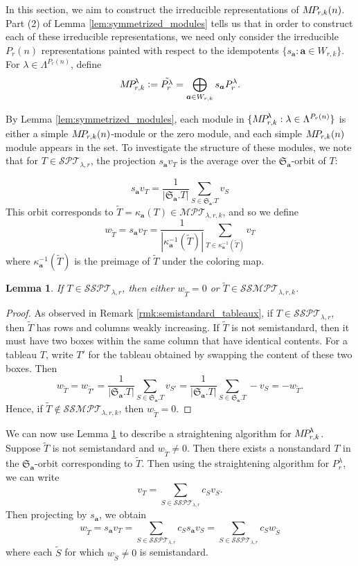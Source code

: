 \documentclass[10pt]{amsart}
\theoremstyle{definition}
\theoremstyle{definition}
\theoremstyle{plain}
\newtheorem{lemma}[lemma]{Lemma}
\theoremstyle{remark}
\theoremstyle{plain}
\theoremstyle{plain}
\newcommand{\SG}{\mathfrak{S}}
\newcommand{\bfa}{{\boldsymbol{a}}}
\newcommand{\MP}{{\rm M\!P\!}}
\newcommand{\MPT}{\mathcal{MPT}}
\newcommand{\SPT}{\mathcal{SPT}}
\newcommand{\SSPT}{\mathcal{SSPT}}
\newcommand{\SSMPT}{\mathcal{SSMPT}}
\newcommand{\tS}{{\tilde{S}}}
\newcommand{\tT}{{\tilde{T}}}
\newcommand{\abs}[1]{\left| #1\right |}
\begin{document}
In this section, we aim to construct the irreducible representations of $\MP_{r,k}(n)$. Part (2) of Lemma \ref{lem:symmetrized_modules} tells us that in order to construct each of these irreducible representations, we need only consider the irreducible $P_r(n)$ representations painted with respect to the idempotents $\{s_\bfa:\bfa\in W_{r,k}\}$. For $\lambda\in\Lambda^{P_r(n)}$, define \[\MP_{r,k}^\lambda\vcentcolon= \tilde{P_r^\lambda}= \bigoplus_{\bfa\in W_{r,k}}s_\bfa P_r^\lambda.\]

By Lemma \ref{lem:symmetrized_modules}, each module in $\{\MP_{r,k}^\lambda:\lambda\in\Lambda^{P_r(n)}\}$ is either a simple $\MP_{r,k}(n)$-module or the zero module, and each simple $\MP_{r,k}(n)$ module appears in the set. To investigate the structure of these modules, we note that for $T\in\SPT_{\lambda,r}$, the projection $s_\bfa v_T$ is the average over the $\SG_\bfa$-orbit of $T$:

\[s_\bfa v_T=\frac{1}{\abs{\SG_\bfa.T}}\sum_{S\in\SG_\bfa.T}v_S\] This orbit corresponds to $\tT=\kappa_\bfa(T)\in\MPT_{\lambda,r,k}$, and so we define \[w_\tT=s_\bfa v_T=\frac{1}{\abs{\kappa_\bfa^{-1}(\tT)}}\sum_{T\in\kappa_\bfa^{-1}(\tT)} v_T\] where $\kappa_\bfa^{-1}(\tT)$ is the preimage of $\tT$ under the coloring map.

\begin{lemma}\label{lem:painting_standard} If $T\in\SSPT_{\lambda,r}$, then either $w_\tT=0$ or $\tT\in\SSMPT_{\lambda,r,k}$.
\end{lemma}

\begin{proof}
    As observed in Remark \ref{rmk:semistandard_tableaux}, if $T\in\SSPT_{\lambda,r}$, then $\tT$ has rows and columns weakly increasing. If $\tT$ is not semistandard, then it must have two boxes within the same column that have identical contents. For a tableau $T$, write $T'$ for the tableau obtained by swapping the content of these two boxes. Then \[w_{\tT}=w_{\tilde{T'}}=\frac{1}{\abs{\SG_\bfa.T}}\sum_{S\in\SG_\bfa.T}v_{S'}=\frac{1}{\abs{\SG_\bfa.T}}\sum_{S\in\SG_\bfa.T}-v_{S}=-w_{\tT}.\] Hence, if $\tT\notin\SSMPT_{\lambda,r,k}$, then $w_\tT=0$.
\end{proof}

We can now use Lemma \ref{lem:painting_standard} to describe a straightening algorithm for $\MP_{r,k}^\lambda$. Suppose $\tT$ is not semistandard and $w_\tT\neq0$. Then there exists a nonstandard $T$ in the $\SG_\bfa$-orbit corresponding to $\tT$. Then using the straightening algorithm for $P_r^\lambda$, we can write \[v_T=\sum_{S\in\SSPT_{\lambda,r}}c_Sv_S.\]
Then projecting by $s_\bfa$, we obtain \[w_\tT=s_\bfa v_T=\sum_{S\in\SSPT_{\lambda,r}} c_S s_\bfa v_S=\sum_{S\in\SSPT_{\lambda,r}} c_S w_\tS\] where each $\tS$ for which $w_{\tS}\neq0$ is semistandard.
\end{document}
